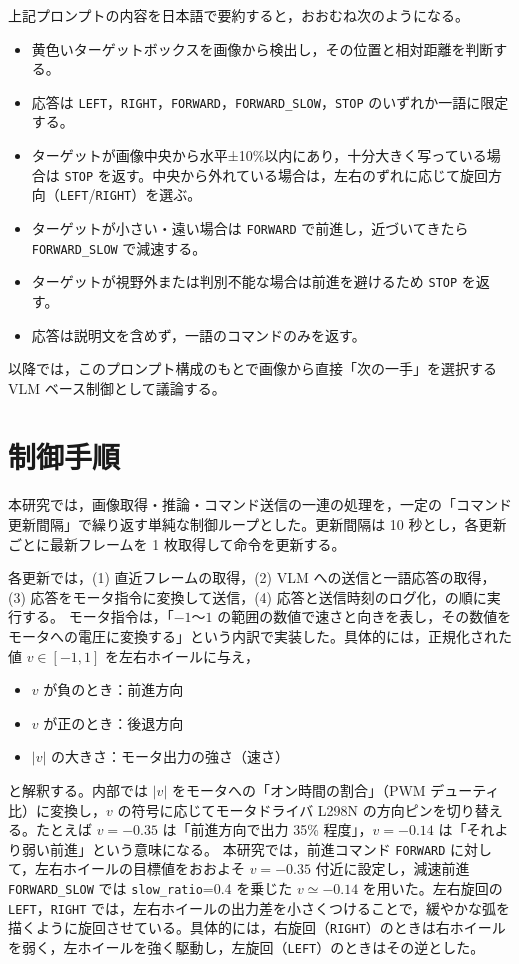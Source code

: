 \documentclass[a4paper,11pt]{ltjsreport}
\begin{document}
上記プロンプトの内容を日本語で要約すると，おおむね次のようになる。

\begin{itemize}
  \item 黄色いターゲットボックスを画像から検出し，その位置と相対距離を判断する。
  \item 応答は \texttt{LEFT}，\texttt{RIGHT}，\texttt{FORWARD}，\texttt{FORWARD\_SLOW}，\texttt{STOP} のいずれか一語に限定する。
  \item ターゲットが画像中央から水平±10\%以内にあり，十分大きく写っている場合は \texttt{STOP} を返す。中央から外れている場合は，左右のずれに応じて旋回方向（\texttt{LEFT}/\texttt{RIGHT}）を選ぶ。
  \item ターゲットが小さい・遠い場合は \texttt{FORWARD} で前進し，近づいてきたら \texttt{FORWARD\_SLOW} で減速する。
  \item ターゲットが視野外または判別不能な場合は前進を避けるため \texttt{STOP} を返す。
  \item 応答は説明文を含めず，一語のコマンドのみを返す。
\end{itemize}

以降では，このプロンプト構成のもとで画像から直接「次の一手」を選択する VLM ベース制御として議論する。

\section{制御手順}
本研究では，画像取得・推論・コマンド送信の一連の処理を，一定の「コマンド更新間隔」で繰り返す単純な制御ループとした。更新間隔は 10 秒とし，各更新ごとに最新フレームを 1 枚取得して命令を更新する。

各更新では，(1) 直近フレームの取得，(2) VLM への送信と一語応答の取得，(3) 応答をモータ指令に変換して送信，(4) 応答と送信時刻のログ化，の順に実行する。
モータ指令は，「$-1$〜$1$ の範囲の数値で速さと向きを表し，その数値をモータへの電圧に変換する」という内訳で実装した。具体的には，正規化された値 $v \in [-1,1]$ を左右ホイールに与え，
\begin{itemize}
  \item $v$ が負のとき：前進方向
  \item $v$ が正のとき：後退方向
  \item $\lvert v\rvert$ の大きさ：モータ出力の強さ（速さ）
\end{itemize}
と解釈する。内部では $\lvert v\rvert$ をモータへの「オン時間の割合」（PWM デューティ比）に変換し，$v$ の符号に応じてモータドライバ L298N の方向ピンを切り替える。たとえば $v=-0.35$ は「前進方向で出力 35\% 程度」，$v=-0.14$ は「それより弱い前進」という意味になる。
本研究では，前進コマンド \texttt{FORWARD} に対して，左右ホイールの目標値をおおよそ $v=-0.35$ 付近に設定し，減速前進 \texttt{FORWARD\_SLOW} では \texttt{slow\_ratio}=0.4 を乗じた $v\simeq -0.14$ を用いた。左右旋回の \texttt{LEFT}，\texttt{RIGHT} では，左右ホイールの出力差を小さくつけることで，緩やかな弧を描くように旋回させている。具体的には，右旋回（\texttt{RIGHT}）のときは右ホイールを弱く，左ホイールを強く駆動し，左旋回（\texttt{LEFT}）のときはその逆とした。
\end{document}
